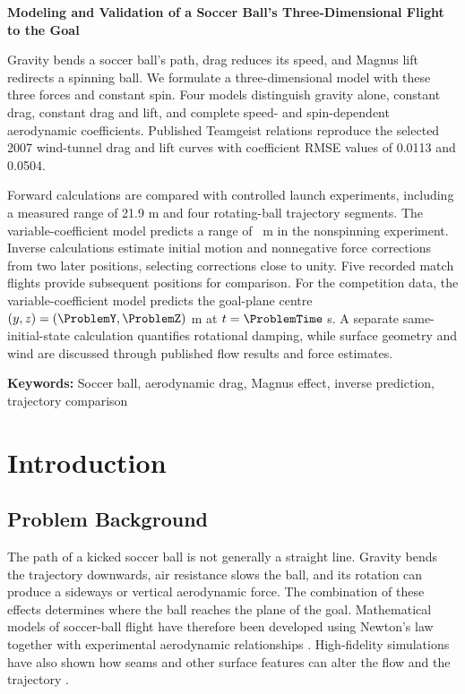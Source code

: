 \documentclass[12pt,letterpaper]{article}
\begin{document}
\begin{center}
{\Large\bfseries Modeling and Validation of a Soccer Ball's Three-Dimensional Flight to the Goal\par}
\vspace{2mm}{\bfseries Problem B\par}
\vspace{3mm}{\bfseries Abstract\par}
\end{center}
Gravity bends a soccer ball's path, drag reduces its speed, and Magnus lift redirects a spinning ball. We formulate a three-dimensional model with these three forces and constant spin. Four models distinguish gravity alone, constant drag, constant drag and lift, and complete speed- and spin-dependent aerodynamic coefficients. Published Teamgeist relations reproduce the selected 2007 wind-tunnel drag and lift curves with coefficient RMSE values of 0.0113 and 0.0504.

Forward calculations are compared with controlled launch experiments, including a measured range of 21.9 m and four rotating-ball trajectory segments. The variable-coefficient model predicts a range of \ForwardMFourRange\ m in the nonspinning experiment. Inverse calculations estimate initial motion and nonnegative force corrections from two later positions, selecting corrections close to unity. Five recorded match flights provide subsequent positions for comparison. For the competition data, the variable-coefficient model predicts the goal-plane centre $(y,z)=(\ProblemY,\ProblemZ)$ m at $t=\ProblemTime$ s. A separate same-initial-state calculation quantifies rotational damping, while surface geometry and wind are discussed through published flow results and force estimates.

\noindent\textbf{Keywords:} Soccer ball, aerodynamic drag, Magnus effect, inverse prediction, trajectory comparison
\newpage\tableofcontents\newpage
\section{Introduction}
\subsection{Problem Background}
The path of a kicked soccer ball is not generally a straight line. Gravity bends the trajectory downwards, air resistance slows the ball, and its rotation can produce a sideways or vertical aerodynamic force. The combination of these effects determines where the ball reaches the plane of the goal. Mathematical models of soccer-ball flight have therefore been developed using Newton's law together with experimental aerodynamic relationships \cite{bray,maponi,kiratidis2018}. High-fidelity simulations have also shown how seams and other surface features can alter the flow and the trajectory \cite{paudel}.
\end{document}
